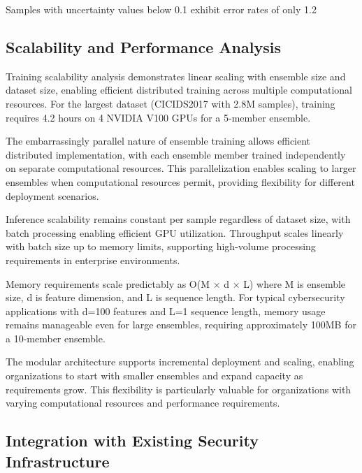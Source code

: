 \documentclass[journal]{IEEEtran}
\begin{document}
Samples with uncertainty values below 0.1 exhibit error rates of only 1.2%

\subsection{Scalability and Performance Analysis}

Training scalability analysis demonstrates linear scaling with ensemble size and dataset size, enabling efficient distributed training across multiple computational resources. For the largest dataset (CICIDS2017 with 2.8M samples), training requires 4.2 hours on 4 NVIDIA V100 GPUs for a 5-member ensemble.

The embarrassingly parallel nature of ensemble training allows efficient distributed implementation, with each ensemble member trained independently on separate computational resources. This parallelization enables scaling to larger ensembles when computational resources permit, providing flexibility for different deployment scenarios.

Inference scalability remains constant per sample regardless of dataset size, with batch processing enabling efficient GPU utilization. Throughput scales linearly with batch size up to memory limits, supporting high-volume processing requirements in enterprise environments.

Memory requirements scale predictably as O(M × d × L) where M is ensemble size, d is feature dimension, and L is sequence length. For typical cybersecurity applications with d=100 features and L=1 sequence length, memory usage remains manageable even for large ensembles, requiring approximately 100MB for a 10-member ensemble.

The modular architecture supports incremental deployment and scaling, enabling organizations to start with smaller ensembles and expand capacity as requirements grow. This flexibility is particularly valuable for organizations with varying computational resources and performance requirements.

\subsection{Integration with Existing Security Infrastructure}
\end{document}
